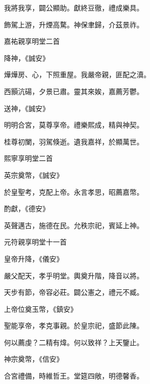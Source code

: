\begin{pinyinscope}
 我將我享，闢公顯助。獻終豆徹，禮成樂具。



 飾駕上游，升煙高騖。神保聿歸，介茲景祚。



 嘉祐親享明堂二首



 降神，《誠安》



 燁燁房、心，下照重屋。我嚴帝親，匪配之瀆。



 西顥沆碭，夕景已肅。靈其來娭，嘉薦芳鬱。



 送神，《誠安》



 明明合宮，莫尊享帝。禮樂熙成，精與神契。



 桂尊初闌，羽駕倏逝。遺我嘉祥，於顯萬世。



 熙寧享明堂二首



 英宗奠幣，《誠安》



 於皇聖考，克配上帝。永言孝思，昭薦嘉幣。



 酌獻，《德安》



 英聲邁古，施德在民。允秩宗祀，賓延上神。



 元符親享明堂十一首



 皇帝升降，《儀安》



 嚴父配天，孝乎明堂。輿奠升階，降音以將。



 天步有節，帝容必莊。闢公憲之，禮元不臧。



 上帝位奠玉幣，《鎮安》



 聖能享帝，孝克事親。於皇宗祀，盛節此陳。



 何以薦虔？二精有煒。何以致祥？上天鑒止。



 神宗奠幣，《信安》



 合宮禮備，時維哲王。堂筵四敞，明德馨香。




\end{pinyinscope}
